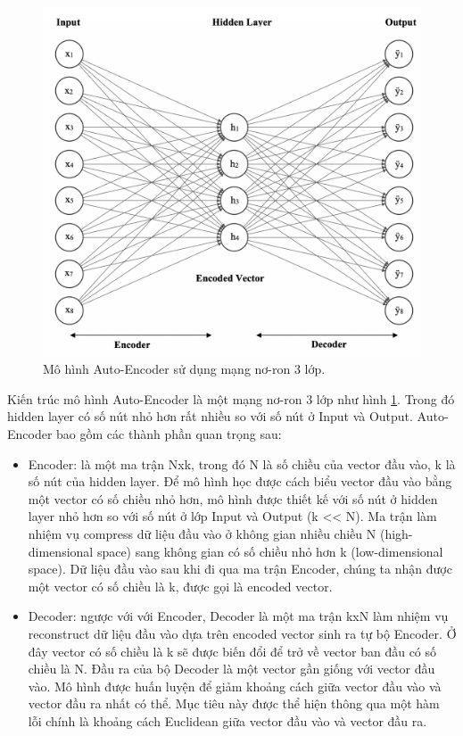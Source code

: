 \begin{figure}[h!]
\begin{center}
	\includegraphics[width=1.0\textwidth]{chapter04/figure/auto-encoder-architecture.png}
	\caption{Mô hình Auto-Encoder sử dụng mạng nơ-ron 3 lớp.}
	\label{fig:auto-encoder-architecture}
\end{center}
\end{figure}

Kiến trúc mô hình Auto-Encoder là một mạng nơ-ron 3 lớp như hình \ref{fig:auto-encoder-architecture}. Trong đó hidden layer có số nút nhỏ hơn rất nhiều so với số nút ở Input và Output. Auto-Encoder bao gồm các thành phần quan trọng sau:

\begin{itemize}
    \item Encoder: là một ma trận Nxk, trong đó N là số chiều của vector đầu vào, k là số nút của hidden layer. Để mô hình  học được cách biểu vector đầu vào bằng một vector có số chiều nhỏ hơn, mô hình được thiết kế với số nút ở hidden layer nhỏ hơn so với số nút ở lớp Input và Output (k << N). Ma trận làm nhiệm vụ compress dữ liệu đầu vào ở không gian nhiều chiều N (high-dimensional space) sang không gian có số chiều nhỏ hơn k (low-dimensional space). Dữ liệu đầu vào sau khi đi qua ma trận Encoder, chúng ta nhận được một vector có số chiều là k, được gọi là encoded vector.
    \item Decoder: ngược với với Encoder, Decoder là một ma trận kxN làm nhiệm vụ reconstruct dữ liệu đầu vào dựa trên encoded vector sinh ra tự bộ Encoder. Ở đây vector có số chiều là k sẽ được biến đổi để trở về vector ban đầu có số chiều là N. Đầu ra của bộ Decoder là một vector gần giống với vector đầu vào. Mô hình được huấn luyện để giảm khoảng cách giữa vector đầu vào và vector đầu ra nhất có thể. Mục tiêu này được thể hiện thông qua một hàm lỗi chính là khoảng cách Euclidean giữa vector đầu vào và vector đầu ra.
\end{itemize}

